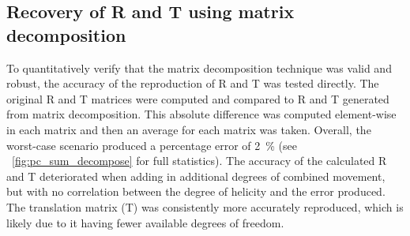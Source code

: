 \documentclass{osa-article}
\begin{document}
\subsection{Recovery of R and T using matrix decomposition}

To quantitatively verify that the matrix decomposition technique was valid and robust, the accuracy of the reproduction of \gls{R} and \gls{T} was tested directly.
The original \gls{R} and \gls{T} matrices were computed and compared to \gls{R} and \gls{T} generated from matrix decomposition. This absolute difference was computed element-wise in each matrix and then an average for each matrix was taken.
Overall, the worst-case scenario produced a percentage error of \SI{2}{\percent} (see \figurename~\ref{fig:pc_sum_decompose} for full statistics).
The accuracy of the calculated \gls{R} and \gls{T} deteriorated when adding in additional degrees of combined movement, but with no correlation between the degree of helicity and the error produced.
The translation matrix (\gls{T}) was consistently more accurately reproduced, which is likely due to it having fewer available degrees of freedom.


\end{document}
